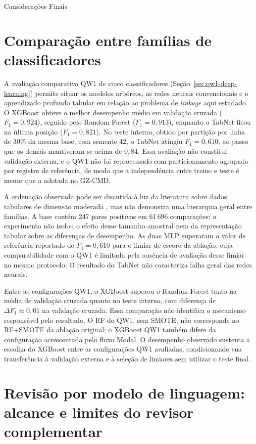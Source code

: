 \begin{chapter}{Considerações Finais}


\section{Comparação entre famílias de classificadores}
\label{sec:cap6-qw1-discussion}

A avaliação comparativa QW1 de cinco classificadores (Seção~\ref{sec:qw1-deep-learning}) permite situar os modelos arbóreos, as redes neurais convencionais e o aprendizado profundo tabular em relação ao problema de \textit{linkage} aqui estudado. O XGBoost obteve o melhor desempenho médio em validação cruzada ($F_1 = 0{,}924$), seguido pelo Random Forest ($F_1 = 0{,}913$), enquanto o TabNet ficou na última posição ($F_1 = 0{,}821$). No teste interno, obtido por partição por linha de 30\% da mesma base, com semente 42, o TabNet atingiu $F_1 = 0{,}610$, ao passo que os demais mantiveram-se acima de $0{,}84$. Essa avaliação não constitui validação externa, e o QW1 não foi reprocessado com particionamento agrupado por registro de referência, de modo que a independência entre treino e teste é menor que a adotada no GZ-CMD.

A ordenação observada pode ser discutida à luz da literatura sobre dados tabulares de dimensão moderada \cite{Grinsztajn2022tabular, ShwartzZiv2022tabular}, mas não demonstra uma hierarquia geral entre famílias. A base contém 247 pares positivos em 61\,696 comparações; o experimento não isolou o efeito desse tamanho amostral nem da representação tabular sobre as diferenças de desempenho. As duas MLP superaram o valor de referência reportado de $F_1 = 0{,}610$ para o limiar de escore da ablação, cuja comparabilidade com o QW1 é limitada pela ausência de avaliação desse limiar no mesmo protocolo. O resultado do TabNet não caracteriza falha geral das redes neurais.

Entre as configurações QW1, o XGBoost superou o Random Forest tanto na média de validação cruzada quanto no teste interno, com diferença de $\Delta F_1 \approx 0{,}01$ na validação cruzada. Essa comparação não identifica o mecanismo responsável pelo resultado. O RF do QW1, sem SMOTE, não corresponde ao RF+SMOTE da ablação original; o XGBoost QW1 também difere da configuração acrescentada pelo fluxo Modal. O desempenho observado sustenta a escolha do XGBoost entre as configurações QW1 avaliadas, condicionando sua transferência à validação externa e à seleção de limiares sem utilizar o teste final.

\section{Revisão por modelo de linguagem: alcance e limites do revisor complementar}
\label{sec:cap6-qw2-llm-discussion}


\end{chapter}
